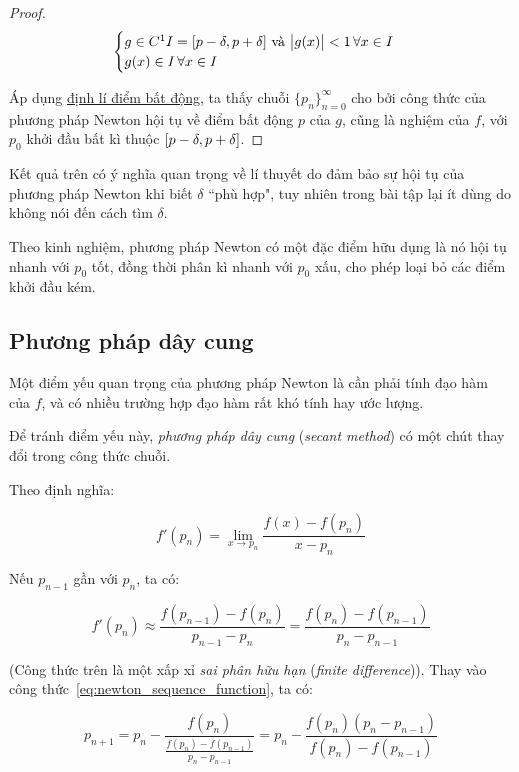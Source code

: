 \documentclass[../../Lectures]{subfiles}
\begin{document}
\begin{proof}
    \[\begin{cases}
        g \in C^1 I = \interval{p - \delta}{p + \delta} \text{ và } \abs{g(x)} < 1 \, \forall x \in I \\
        g(x) \in I \, \forall x \in I
    \end{cases}\]

    Áp dụng \hyperref[thm:fixed_point]{định lí điểm bất động}, ta thấy chuỗi
    \(\{p_n\}_{n = 0}^\infty\) cho bởi công thức của phương pháp Newton hội tụ
    về điểm bất động \(p\) của \(g\), cũng là nghiệm của \(f\), với \(p_0\) khởi
    đầu bất kì thuộc \(\interval{p - \delta}{p + \delta}\).
\end{proof}

Kết quả trên có ý nghĩa quan trọng về lí thuyết do đảm bảo sự hội tụ của phương
pháp Newton khi biết \(\delta\) ``phù hợp", tuy nhiên trong bài tập lại ít dùng
do không nói đến cách tìm \(\delta\).

Theo kinh nghiệm, phương pháp Newton có một đặc điểm hữu dụng là nó hội tụ nhanh
với \(p_0\) tốt, đồng thời phân kì nhanh với \(p_0\) xấu, cho phép loại bỏ các
điểm khởi đầu kém.

\subsection{Phương pháp dây cung}

Một điểm yếu quan trọng của phương pháp Newton là cần phải tính đạo hàm của
\(f\), và có nhiều trường hợp đạo hàm rất khó tính hay ước lượng.

Để tránh điểm yếu này, \emph{phương pháp dây cung} (\emph{secant method}) có một
chút thay đổi trong công thức chuỗi.

Theo định nghĩa:

\[f'(p_n) = \lim_{x \to p_n} \frac{f(x) - f(p_n)}{x - p_n}\]

Nếu \(p_{n - 1}\) gần với \(p_n\), ta có:

\[f'(p_n) \approx \frac{f(p_{n - 1}) - f(p_n)}{p_{n - 1} - p_n} = \frac{f(p_n) - f(p_{n - 1})}{p_n - p_{n - 1}}\]

(Công thức trên là một xấp xỉ \emph{sai phân hữu hạn} (\emph{finite
difference})). Thay vào công thức~\ref{eq:newton_sequence_function}, ta có:

\begin{equation}\label{eq:secant_method}
    p_{n + 1} = p_n - \frac{f(p_n)}{\frac{f(p_n) - f(p_{n - 1})}{p_n - p_{n - 1}}} = p_n - \frac{f(p_n) (p_n - p_{n - 1})}{f(p_n) - f(p_{n - 1})}
\end{equation}
\end{document}
